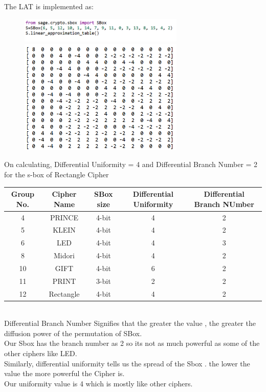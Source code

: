 \documentclass[journal=tosc,preprint]{iacrtrans}
\begin{document}
The LAT is implemented as:
\begin{figure}[H]
    \centering
    \includegraphics[width=0.7\textwidth]{Screenshot 2024-11-30 142114.png}
    \includegraphics[width=0.7\textwidth]{Screenshot 2024-11-30 142130.png}
\end{figure}

On calculating, Differential Uniformity = 4 and Differential Branch Number = 2 for the s-box of Rectangle Cipher\\
\begin{table}[h!]
\centering
\begin{tabular}{|c|c|c|c|c|}
\hline
Group No. & Cipher Name & SBox size & Differential Uniformity & Differential Branch NUmber \\ \hline
4   & PRINCE   & 4-bit   & 4   & 2 \\ \hline
5   & KLEIN  & 4-bit   & 4   & 2  \\ \hline
6  & LED  & 4-bit  & 4  & 3  \\ \hline
8   & Midori   & 4-bit   & 4   & 2   \\ \hline
10 & GIFT  & 4-bit   & 6   & 2  \\ \hline
11  & PRINT  & 3-bit  & 2  & 2  \\ \hline
12  & Rectangle  & 4-bit  & 4  & 2  \\ \hline

\end{tabular}
\label{tab:example}
\end{table}
\\
Differential Branch Number Signifies that the greater the value , the greater the diffusion power of the permutation of SBox.\\
Our Sbox has the branch number as 2 so its not as much powerful as some of the other ciphers like LED.\\
Similarly, differential uniformity tells us the spread of the Sbox . the lower the value the more powerful the Cipher is.\\
Our uniformity value is 4 which is mostly like other
ciphers.
\end{document}
